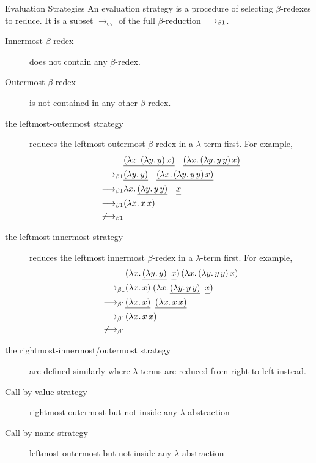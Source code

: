 \begin{frame}[allowframebreaks]{Evaluation Strategies}
An evaluation strategy is a procedure of selecting $\beta$-redexes
to reduce. It is a subset $\longrightarrow_{\mathrm{ev}}$ of the full
$\beta$-reduction $\longrightarrow_{\beta1}$.

\begin{description}
  \item[Innermost $\beta$-redex] does not contain any $\beta$-redex.
  \item[Outermost $\beta$-redex] is not contained in any other $\beta$-redex.
\end{description}

\begin{description}
  \item[the leftmost-outermost strategy] reduces the leftmost outermost
    $\beta$-redex in a $\lambda$-term first. For example, 
    \begin{align*}
      & 
      \underline{(\lambda x.\, (\lambda y.\, y)\,x)}\quad
      \underline{(\lambda x.\, (\lambda y.\, y\,y)\,x)}
      \\
      \longrightarrow_{\beta1} &
      \underline{(\lambda y.\, y)}\quad
      \underline{(\lambda x.\, (\lambda y.\, y\,y)\, x)} \\
      \longrightarrow_{\beta1} &
      \lambda x.\, \underline{(\lambda y.\, y\,y)}\quad
      \underline{\vphantom{(\lambda}x} \\
      \longrightarrow_{\beta1} & (\lambda x.\, x\,x) \\
      \not\longrightarrow_{\beta1}
    \end{align*}
  \item[the leftmost-innermost strategy] reduces the leftmost innermost
    $\beta$-redex in a $\lambda$-term first. For example, 
    \begin{align*}
      & (\lambda x.\, \underline{(\lambda y.\,
        y)}\;\;\underline{\vphantom{(\lambda} x})\,
      (\lambda x.\, (\lambda y.\, y\, y)\,x) \\
      \longrightarrow_{\beta1} & (\lambda x.\,x)\;
      (\lambda x.\, \underline{(\lambda y.\, y\,
        y)}\;\;\underline{\vphantom{(\lambda}x}) \\
      \longrightarrow_{\beta1} & \underline{(\lambda x.\,x)}\;\;\underline{(\lambda x.\, x\,x)} \\
      \longrightarrow_{\beta1} & (\lambda x.\, x\, x) \\
      \not\longrightarrow_{\beta1}
    \end{align*}
  \item[the rightmost-innermost/outermost strategy]
    are defined similarly where $\lambda$-terms are reduced from right to left
    instead.
\end{description}
\begin{description}
  \item[Call-by-value strategy]
    rightmost-outermost but not inside any $\lambda$-abstraction
  \item[Call-by-name strategy]
    leftmost-outermost but not inside any $\lambda$-abstraction
\end{description}


\end{frame}
